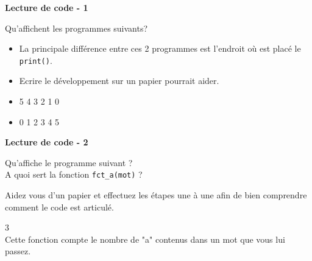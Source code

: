 	\begin{Exercice}[5 minutes] \textbf{Lecture de code - 1} 
	
	Qu'affichent les programmes suivants? \\ 
	
	 
	
	 
	
		\begin{conseil} 
		\begin{itemize} 
			\item La principale différence entre ces 2 programmes est l'endroit où est placé le \lstinline{print()}. 
			\item Ecrire le développement sur un papier pourrait aider. 
		\end{itemize} 
		\end{conseil} 
	
		\begin{solution} 
		\begin{itemize} 
			\item 
			5 
			4 
			3 
			2 
			1 
			0 
			\item 
			0 
			1 
			2 
			3 
			4 
			5 
		\end{itemize} 
	
		\end{solution} 
	
	\end{Exercice}
	
	\begin{Exercice}[5 minutes] \textbf{Lecture de code - 2} 
	
	Qu'affiche le programme suivant ? \\ 
	
	A quoi sert la fonction \lstinline{fct_a(mot)} ? \\
	
	  
	
		\begin{conseil} 
		Aidez vous d'un papier et effectuez les étapes une à une afin de bien comprendre comment le code est articulé.
		\end{conseil} 
	
		\begin{solution} 
		3 \\
		
		Cette fonction compte le nombre de "a" contenus dans un mot que vous lui passez.
	
		\end{solution} 
	
	\end{Exercice}
	
